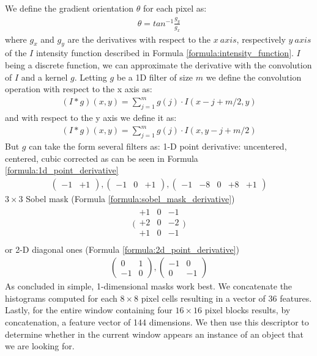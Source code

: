 We define the gradient orientation $\theta$ for each pixel as:
\begin{align}
	\theta = tan^{-1}\frac{g_{y}}{g_{x}}
\end{align}
where $g_{x}$ and $g_{y}$ are the derivatives with respect to the $x\ axis$, respectively $y\ axis$ of the $I$ intensity function described in Formula \ref{formula:intensity_function}. $I$ being a discrete function, we can approximate the derivative with the convolution of $I$ and a kernel $g$. Letting $g$ be a 1D filter of size $m$ we define the convolution operation with respect to the x axis as:
\begin{align}
	(I*g)(x,y) = \sum_{j=1}^{m}g(j)\cdot I(x-j+m/2, y)
\end{align}
and with respect to the y axis we define it as:
\begin{align}
	(I*g)(x,y) = \sum_{j=1}^{m}g(j)\cdot I(x,y-j+m/2)
\end{align}
But $g$ can take the form several filters as: 1-D point derivative: uncentered, centered, cubic corrected as can be seen in Formula \ref{formula:1d_point_derivative}
\begin{align}
(\begin{smallmatrix}
-1 & +1
\end{smallmatrix}), 
(
\begin{smallmatrix}
-1 & 0 & +1
\end{smallmatrix}), 
 ( 
 \begin{smallmatrix}
 -1 & -8 & 0 & +8 & +1
 \end{smallmatrix})
 \label{formula:1d_point_derivative}
\end{align}
$3\times3$ Sobel mask (Formula \ref{formula:sobel_mask_derivative})
\begin{align}
\bigl(
\begin{smallmatrix}
+1 & 0 & -1 \\
+2 & 0 & -2 \\
+1 & 0 & -1 \\
\end{smallmatrix}
\bigr)
\label{formula:sobel_mask_derivative}
\end{align}
or 2-D diagonal ones (Formula \ref{formula:2d_point_derivative})
\begin{align}
(
\begin{smallmatrix}
	 0 & 1\\
    -1 & 0
\end{smallmatrix}
),
(
\begin{smallmatrix}
	-1 & 0\\
	 0 & -1
\end{smallmatrix}
)
\label{formula:2d_point_derivative}
\end{align}
As concluded in \cite{DalalTriggs05} simple, 1-dimensional masks work best. We concatenate the histograms computed for each $8\times8$ pixel cells resulting in a vector of 36 features. Lastly, for the entire window containing four $16\times16$ pixel blocks results, by concatenation, a feature vector of 144 dimensions.
We then use this descriptor to determine whether in the current window appears an instance of an object that we are looking for.
